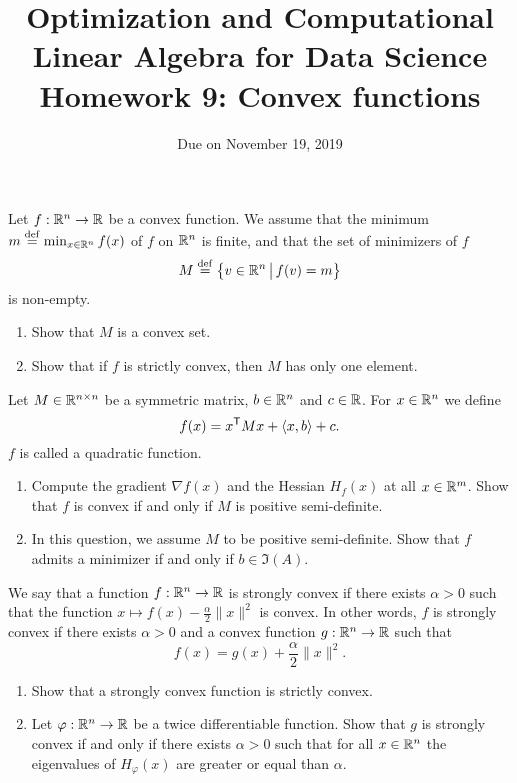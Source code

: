 \documentclass[11pt,nocut]{article}
\title{\vspace{-2.0cm}%
	Optimization and Computational Linear Algebra for Data Science\\
Homework 9: Convex functions}
\date{\vspace{-1cm}Due on November 19, 2019}
\begin{document}
\maketitle




\begin{problem}[2 points]
	Let $f: \mathbb{R}^n \to \mathbb{R}$ be a convex function. We assume that the minimum $m \overset{\rm def}{=} \min_{x \in \mathbb{R}^n} f(x)$ of $f$ on $\mathbb{R}^n$ is finite, and that the set of minimizers of $f$
$$
M \overset{\rm def}{=} \big\{ v \in \mathbb{R}^n \, \big| \, f(v) = m \big\}
$$
is non-empty.

	\begin{enumerate}[label=\normalfont(\textbf{\alph*})]
		\item Show that $M$ is a convex set.
		\item Show that if $f$ is strictly convex, then $M$ has only one element.
	\end{enumerate}

\end{problem}

\vspace{1mm}

\begin{problem}[2 points]
	Let $M \in \mathbb{R}^{n \times n}$ be a symmetric matrix, $b \in \mathbb{R}^n$ and $c \in \mathbb{R}$.
	For $x \in \mathbb{R}^n$ we define
	$$
	f(x) = x^{{\sf T}} M x + \langle x,b \rangle + c.
	$$
	$f$ is called a quadratic function.
	\begin{enumerate}[label=\normalfont(\textbf{\alph*})]
		\item Compute the gradient $\nabla f(x)$ and the Hessian $H_f(x)$ at all $x \in \mathbb{R}^m$. Show that $f$ is convex if and only if $M$ is positive semi-definite.
		\item In this question, we assume $M$ to be positive semi-definite. Show that $f$ admits a minimizer if and only if $b \in \Im(A)$.
	\end{enumerate}
\end{problem}

\vspace{1mm}
\begin{problem}[3 points]\label{prob:strongly_convex}
	We say that a function $f: \mathbb{R}^n \to \mathbb{R}$ is strongly convex if there exists $\alpha >0$ such that the function $x \mapsto f(x) - \frac{\alpha}{2} \|x\|^2$ is convex. In other words, $f$ is strongly convex if there exists $\alpha > 0$ and a convex function $g: \mathbb{R}^n \to \mathbb{R}$ such that 
	$$
	f(x) = g(x) + \frac{\alpha}{2} \|x\|^2.
	$$
	
	\begin{enumerate}[label=\normalfont(\textbf{\alph*})]
		\item Show that a strongly convex function is strictly convex.
		\item Let $\varphi:\mathbb{R}^n \to \mathbb{R}$ be a twice differentiable function. Show that $g$ is strongly convex if and only if there exists $\alpha >0$ such that for all $x \in \mathbb{R}^n$ the eigenvalues of $H_{\varphi}(x)$ are greater or equal than $\alpha$.
	\end{enumerate}
\end{problem}
\end{document}

